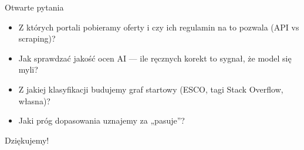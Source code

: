 \documentclass[aspectratio=169,10pt]{beamer}
\begin{document}
\begin{frame}{Otwarte pytania}
  \begin{itemize}
    \item Z których portali pobieramy oferty i czy ich regulamin na to pozwala (API vs scraping)?
    \item Jak sprawdzać jakość ocen AI --- ile ręcznych korekt to sygnał, że model się myli?
    \item Z jakiej klasyfikacji budujemy graf startowy (ESCO, tagi Stack Overflow, własna)?
    \item Jaki próg dopasowania uznajemy za „pasuje”?
  \end{itemize}
  \vfill
  \centering\Large Dziękujemy!
\end{frame}
\end{document}
